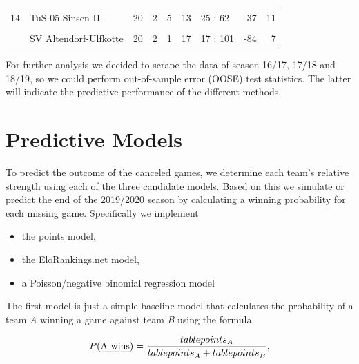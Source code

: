 \documentclass[12pt,a4paper]{article}
\begin{document}
\begin{table}[H]
{\begin{tabular}[t]{rllrrrlrr}
\cellcolor{gray!6}{13} & \cellcolor{gray!6}{SC Reken II} & \cellcolor{gray!6}{19} & \cellcolor{gray!6}{4} & \cellcolor{gray!6}{3} & \cellcolor{gray!6}{12} & \cellcolor{gray!6}{41 : 61} & \cellcolor{gray!6}{-20} & \cellcolor{gray!6}{15}\\
14 & TuS 05 Sinsen II & 20 & 2 & 5 & 13 & 25 : 62 & -37 & 11\\
\cellcolor{gray!6}{15} & \cellcolor{gray!6}{Adler Weseke II} & \cellcolor{gray!6}{20} & \cellcolor{gray!6}{2} & \cellcolor{gray!6}{4} & \cellcolor{gray!6}{14} & \cellcolor{gray!6}{23 : 64} & \cellcolor{gray!6}{-41} & \cellcolor{gray!6}{10}\\
\addlinespace
16 & SV Altendorf-Ulfkotte & 20 & 2 & 1 & 17 & 17 : 101 & -84 & 7\\
\bottomrule
\end{tabular}}
\end{table}

For further analysis we decided to scrape the data of season 16/17,
17/18 and 18/19, so we could perform out-of-sample error (OOSE) test
statistics. The latter will indicate the predictive performance of the
different methods.

\hypertarget{predictive-models}{%
\section{Predictive Models}\label{predictive-models}}

To predict the outcome of the canceled games, we determine each team's
relative strength using each of the three candidate models. Based on
this we simulate or predict the end of the 2019/2020 season by
calculating a winning probability for each missing game. Specifically we
implement

\begin{itemize}
\item the points model,
\item the EloRankings.net model, 
\item a Poisson/negative binomial regression model
\end{itemize}

The first model is just a simple baseline model that calculates the
probability of a team \emph{A} winning a game against team \emph{B}
using the formula

\begin{align}
P(\text{\emph{A wins}}) = \frac{table points_A}{{table points}_A + {table points}_B},
\end{align}
\end{document}
